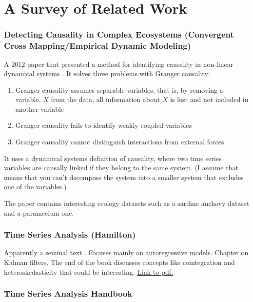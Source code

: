 \documentclass{article}
\begin{document}
\section*{A Survey of Related Work}

    \subsubsection*{Detecting Causality in Complex Ecosystems (Convergent Cross Mapping/Empirical Dynamic Modeling)}

        A 2012 paper that presented a method for identifying causality in non-linear dynamical
        systems \cite{sugihara2012detecting}. It solves three problems with Granger causality: 
        \begin{enumerate}
            \item Granger causality assumes separable variables, that is, by removing a variable,
            $X$ from the data, all information about $X$ is lost and not included in another variable
            \item Granger causality fails to identify weakly coupled variables
            \item Granger causality cannot distinguish interactions from external forces
        \end{enumerate}

        It uses a dynamical systems definition of causality, where two time
        series variables are causally linked if they belong to the same system. (I assume that means 
        that you can't decompose the system into a smaller system that excludes one of the variables.)

        The paper contains interesting ecology datasets such as a sardine anchovy dataset and 
        a paramecium one.

    \subsubsection*{Time Series Analysis (Hamilton)}

        Apparently a seminal text \cite{hamilton1994time}. Focuses mainly on autoregressive models.
        Chapter on Kalman filters. The end of the book discusses concepts like
        cointegration and heteroskedasticity that could be interesting.
        \href{http://mayoral.iae-csic.org/timeseries2021/hamilton.pdf}{Link to pdf.}

    \subsubsection*{Time Series Analysis Handbook}
\end{document}
